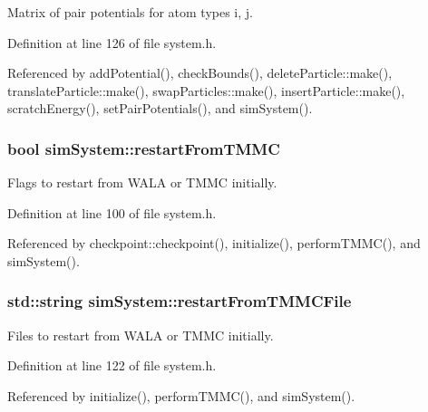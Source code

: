 Matrix of pair potentials for atom types i, j. 



Definition at line 126 of file system.\-h.



Referenced by add\-Potential(), check\-Bounds(), delete\-Particle\-::make(), translate\-Particle\-::make(), swap\-Particles\-::make(), insert\-Particle\-::make(), scratch\-Energy(), set\-Pair\-Potentials(), and sim\-System().

\hypertarget{classsim_system_a0c81d3b606c070c801f8d86288e44391}{
\subsubsection[{restart\-From\-T\-M\-M\-C}]{\setlength{\rightskip}{0pt plus 5cm}bool sim\-System\-::restart\-From\-T\-M\-M\-C}}\label{classsim_system_a0c81d3b606c070c801f8d86288e44391}


Flags to restart from W\-A\-L\-A or T\-M\-M\-C initially. 



Definition at line 100 of file system.\-h.



Referenced by checkpoint\-::checkpoint(), initialize(), perform\-T\-M\-M\-C(), and sim\-System().

\hypertarget{classsim_system_a5ccdad82b3767ba21b1e4b1e36362082}{
\subsubsection[{restart\-From\-T\-M\-M\-C\-File}]{\setlength{\rightskip}{0pt plus 5cm}std\-::string sim\-System\-::restart\-From\-T\-M\-M\-C\-File}}\label{classsim_system_a5ccdad82b3767ba21b1e4b1e36362082}


Files to restart from W\-A\-L\-A or T\-M\-M\-C initially. 



Definition at line 122 of file system.\-h.



Referenced by initialize(), perform\-T\-M\-M\-C(), and sim\-System().

